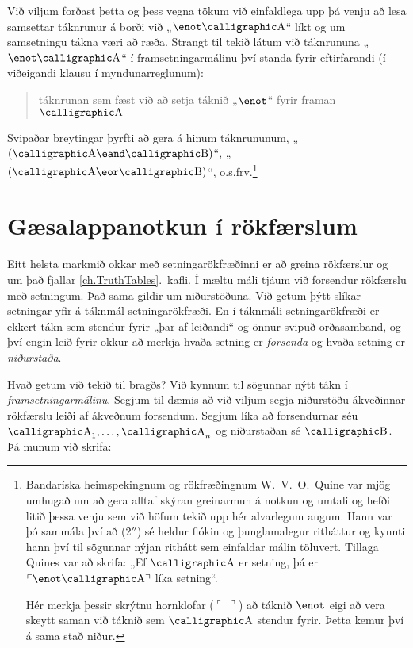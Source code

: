 Við viljum forðast þetta og þess vegna tökum við einfaldlega upp þá venju að lesa samsettar táknrunur á borði við „$\enot \meta{A}$“ líkt og um samsetningu tákna væri að ræða. Strangt til tekið látum við táknrununa „$\enot \meta{A}$“ í framsetningarmálinu því standa fyrir eftirfarandi (í viðeigandi klausu í myndunarreglunum): 
\begin{quote}
	táknrunan sem fæst við að setja táknið „$\enot$“ fyrir framan $\meta{A}$
\end{quote}Svipaðar breytingar þyrfti að gera á hinum táknrununum, „$(\meta{A} \eand \meta{B})$“, „$(\meta{A} \eor \meta{B})$“, o.s.frv.\footnote{Bandaríska heimspekingnum og rökfræðingnum W.\ V.\ O.\ Quine var mjög umhugað um að gera alltaf skýran greinarmun á notkun og umtali og hefði litið þessa venju sem við höfum tekið upp hér alvarlegum augum. Hann var þó sammála því að (2$''$) sé heldur flókin og þunglamalegur ritháttur og kynnti hann því til sögunnar nýjan rithátt sem einfaldar málin töluvert. Tillaga Quines var að skrifa: „Ef $\meta{A}$ er setning, þá er $\ulcorner \enot\meta{A}\urcorner$ líka setning“.

Hér merkja þessir skrýtnu hornklofar ($\ulcorner$ $\urcorner$) að táknið $\enot$ eigi að vera skeytt saman við táknið sem  $\meta{A}$  stendur fyrir. Þetta kemur því á sama stað niður.} 

\section{Gæsalappanotkun í rökfærslum}
Eitt helsta markmið okkar með setningarökfræðinni er að greina rökfærslur og um það fjallar \ref{ch.TruthTables}.\ kafli. Í mæltu máli tjáum við forsendur rökfærslu með setningum. Það sama gildir um niðurstöðuna. Við getum þýtt slíkar setningar yfir á táknmál setningarökfræði. En í táknmáli setningarökfræði er ekkert tákn sem stendur fyrir „þar af leiðandi“ og önnur svipuð orðasamband, og því engin leið fyrir okkur að merkja hvaða setning er \emph{forsenda} og hvaða setning er \emph{niðurstaða}.

Hvað getum við tekið til bragðs? Við kynnum til sögunnar nýtt tákn í \emph{framsetningarmálinu}. Segjum til dæmis að við viljum segja niðurstöðu ákveðinnar rökfærslu leiði af ákveðnum forsendum. Segjum líka að forsendurnar séu $\meta{A}_{1}, \ldots, \meta{A}_{n}$ og niðurstaðan sé $\meta{B}$. Þá munum við skrifa: 



